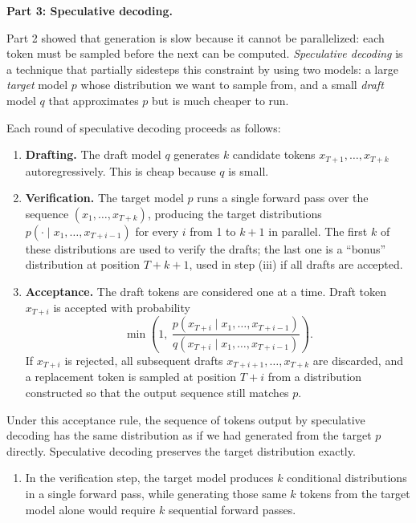 \documentclass[submit]{harvardml}
\begin{document}
\newpage

\begin{framed}
\noindent \textbf{Part 3: Speculative decoding.}

\noindent Part 2 showed that generation is slow because it cannot be parallelized: each token must be sampled before the next can be computed. \emph{Speculative decoding} is a technique that partially sidesteps this constraint by using two models: a large \emph{target} model $p$ whose distribution we want to sample from, and a small \emph{draft} model $q$ that approximates $p$ but is much cheaper to run.

Each round of speculative decoding proceeds as follows:

\begin{enumerate}
  \item[(i)] \textbf{Drafting.} The draft model $q$ generates $k$ candidate tokens $x_{T+1}, \ldots, x_{T+k}$ autoregressively. This is cheap because $q$ is small.
  \item[(ii)] \textbf{Verification.} The target model $p$ runs a single forward pass over the sequence $(x_1, \ldots, x_{T+k})$, producing the target distributions $p(\cdot \mid x_1, \ldots, x_{T+i-1})$ for every $i$ from 1 to $k+1$ in parallel. The first $k$ of these distributions are used to verify the drafts; the last one is a ``bonus'' distribution at position $T+k+1$, used in step (iii) if all drafts are accepted.
  \item[(iii)] \textbf{Acceptance.} The draft tokens are considered one at a time. Draft token $x_{T+i}$ is accepted with probability
  \[
  \min\!\left(1, \ \frac{p(x_{T+i} \mid x_1, \ldots, x_{T+i-1})}{q(x_{T+i} \mid x_1, \ldots, x_{T+i-1})}\right).
  \]
  If $x_{T+i}$ is rejected, all subsequent drafts $x_{T+i+1}, \ldots, x_{T+k}$ are discarded, and a replacement token is sampled at position $T+i$ from a distribution constructed so that the output sequence still matches $p$.
\end{enumerate}

Under this acceptance rule, the sequence of tokens output by speculative decoding has the same distribution as if we had generated from the target $p$ directly. Speculative decoding preserves the target distribution exactly.

\begin{enumerate}
  \item[3a.] In the verification step, the target model produces $k$ conditional distributions in a single forward pass, while generating those same $k$ tokens from the target model alone would require $k$ sequential forward passes.
  

\end{enumerate}
\end{framed}
\end{document}
